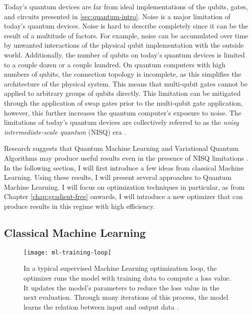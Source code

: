 Today's quantum devices are far from ideal implementations of the qubits, gates,
and circuits presented in \autoref{sec:quantum-intro}.
Noise is a major limitation of today's quantum devices.
Noise is hard to describe completely since it can be the result of a multitude
of factors.
For example, noise can be accumulated over time by unwanted interactions of the
physical qubit implementation with the outside world.
Additionally, the number of qubits on today's quantum devices is limited to a
couple dozen or a couple hundred.
On quantum computers with high numbers of qubits, the connection topology is
incomplete, as this simplifies the architecture of the physical system. 
This means that multi-qubit gates cannot be applied to arbitrary groups of
qubits directly.
This limitation can be mitigated through the application of swap gates prior
to the multi-qubit gate application, however, this further increases the quantum
computer's exposure to noise.
The limitations of today's quantum devices are collectively referred to as the
\emph{noisy intermediate-scale quantum} (NISQ) era
\cite{preskill_quantum_2018,nielsen_quantum_2007}.

Research suggests that Quantum Machine Learning and Variational Quantum
Algorithms may produce useful results even in the presence of NISQ limitations
\cite{cerezo_variational_2021}.
In the following section, I will first introduce a few ideas from classical
Machine Learning.
Using these results, I will present several approaches to Quantum Machine
Learning.
I will focus on optimization techniques in particular, as from Chapter
\ref{chap:gradient-free} onwards, I will introduce a new optimizer that can
produce results in this regime with high efficiency.

\subsection{Classical Machine Learning}
\label{sec:classical-ml-intro}

\begin{figure}
    \centering
    \texttt{[image: ml-training-loop]}
    \caption{In a typical supervised Machine Learning optimization loop, the
        optimizer runs the model with training data to compute a loss value.
        It updates the model's parameters to reduce the loss value in the next
        evaluation.
        Through many iterations of this process, the model learns the relation
        between input and output data \cite{bishop_pattern_2006}.}
    \label{fig:ml-training-loop}
\end{figure}

